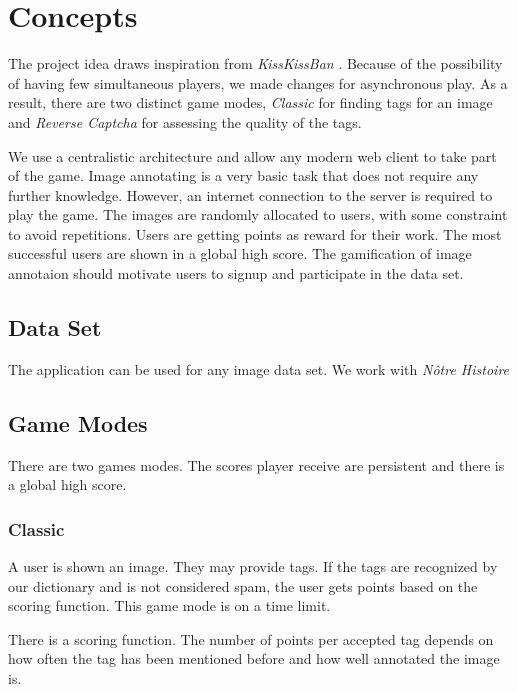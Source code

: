\section{Concepts}
\label{g14:sec:concepts} %

The project idea draws inspiration from \textit{KissKissBan} \cite{10.1145/1600150.1600153}.
Because of the possibility of having few simultaneous players, we made changes for asynchronous play. As a result, there are two distinct game modes, \emph{Classic} for finding tags for an image and \emph{Reverse Captcha} for assessing the quality of the tags.

We use a centralistic architecture and allow any modern web client to take part of the game. Image annotating is a very basic task that does not require any further knowledge. However, an internet connection to the server is required to play the game. The images are randomly allocated to users, with some constraint to avoid repetitions.
Users are getting points as reward for their work. The most successful users are shown in a global high score. The gamification of image annotaion should motivate users to signup and participate in the data set.


\subsection{Data Set}
The application can be used for any image data set. We work with \textit{Nôtre Histoire}

\subsection{Game Modes}

There are two games modes. The scores player receive are persistent and there is a global high score. 

\subsubsection{Classic}

A user is shown an image. They may provide tags. If the tags are recognized by our dictionary and is not considered spam, the user gets points based on the scoring function.
This game mode is on a time limit.

There is a scoring function. The number of points per accepted tag depends on how often the tag has been mentioned before and how well annotated the image is.


